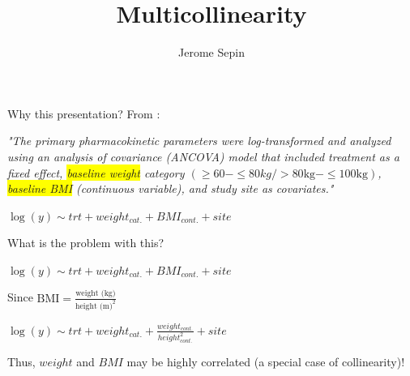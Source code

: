 \documentclass[english]{beamer}\usepackage[]{graphicx}\usepackage[]{xcolor}
\title[Multicollinearity]{Multicollinearity}
\author{Jerome Sepin}
\begin{document}
\maketitle

\begin{frame}{Why this presentation?}
From \cite{Schwabe2022}:

\textit{
"The primary pharmacokinetic parameters were log-transformed and analyzed using an analysis of covariance (ANCOVA) model that included treatment as a fixed effect, \colorbox{yellow}{baseline weight} category $\left(\geq 60-\leq 80kg/>80\text{kg}-\leq 100\text{kg}\right)$, \colorbox{yellow}{baseline BMI} (continuous variable), and study site as covariates." 
}
\begin{center}
$\boxed{\log(y)\sim trt + weight_{cat.} + BMI_{cont.}+ site}$
\end{center}

\end{frame}
\begin{frame}{What is the problem with this?}
\begin{center}
$\boxed{\log(y)\sim trt + weight_{cat.} + BMI_{cont.}+ site}$
\end{center}
Since $\text{BMI}=\frac{\text{weight (kg)}}{\text{height (m)}^2}$
\begin{center}
$\boxed{\log(y)\sim trt + weight_{cat.} + \frac{weight_{cont.}}{height^2_{cont.}}+ site}$
\end{center}

Thus, $weight$ and $BMI$ may be highly correlated (a special case of collinearity)!




\end{frame}
\end{document}
